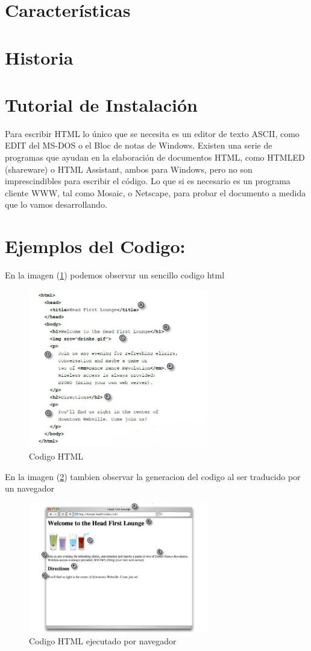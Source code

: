\documentclass[11pt]{article} %
\begin{document}
\section{Características}
\section{Historia}
\section{Tutorial de Instalación}
Para escribir HTML lo único que se necesita es un editor de texto ASCII, como EDIT del MS-DOS o el Bloc de notas de Windows. \singlespace
\thinspace Existen una serie de programas que ayudan en la elaboración de documentos HTML, como HTMLED (shareware) o HTML Assistant, ambos para Windows, pero no son imprescindibles para escribir el código. Lo que si es necesario es un programa cliente WWW, tal como Mosaic, o Netscape, para probar el documento a medida que lo vamos desarrollando.

\section{Ejemplos del Codigo:}


En la imagen (\ref{fig:5.1})  podemos observar un sencillo codigo html 

\begin{figure}[htb]
\includegraphics[width=0.7\textwidth]{img1.png}
\caption{Codigo HTML}
\label{fig:5.1}
\end{figure}

\singlespace
En la imagen (\ref{fig:5.2}) tambien observar la generacion del codigo al ser traducido por un navegador

\begin{figure}[htb]
\includegraphics[width=0.7\textwidth]{img2.png}
\caption{Codigo HTML ejecutado por navegador}
\label{fig:5.2}
\end{figure}
\end{document}
